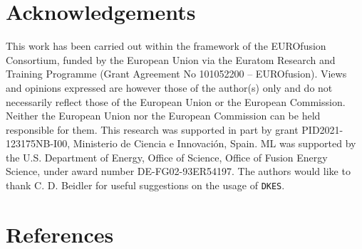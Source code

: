 \documentclass[10pt]{iopart}
\newcommand{\DKES}{{\texttt{DKES}}}
\begin{document}
\section*{Acknowledgements}
This work has been carried out within the framework of the EUROfusion Consortium, funded by the European Union via the Euratom Research and Training Programme (Grant Agreement No 101052200 – EUROfusion). Views and opinions expressed are however those of the author(s) only and do not necessarily reflect those of the European Union or the European Commission. Neither the European Union nor the European Commission can be held responsible for them. This research was supported in part by grant PID2021-123175NB-I00, Ministerio de Ciencia e Innovación, Spain. 
ML was supported by the U.S. Department of Energy, Office of Science, Office of Fusion Energy Science, under award number DE-FG02-93ER54197. The authors would like to thank C. D. Beidler for useful suggestions on the usage of {\DKES}.


\section*{References}

{}
\end{document}

